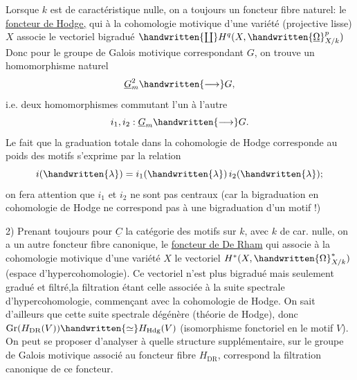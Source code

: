 Lorsque $k$ est de caractéristique nulle, on a toujours un foncteur fibre naturel: le \uline{foncteur de Hodge,} qui à la cohomologie motivique d'une variété (projective lisse) $X$ associe le vectoriel bigradué $\handwritten{\coprod}H^q(X,\handwritten{\underline{\Omega}}^p_{X/k})$ Donc pour le groupe de Galois motivique correspondant $G$, on trouve un homomorphisme naturel
\[
\underline{G}_m^2\handwritten{\longrightarrow}G,
\]
i.e. deux homomorphismes commutant l'un à l'autre
\[
i_1,i_2:\underline{G}_m\handwritten{\longrightarrow}G.
\]
Le fait que la graduation totale dans la cohomologie de Hodge corresponde au poids des motifs s'exprime par la relation
\[
i(\handwritten{\lambda})=i_1(\handwritten{\lambda})\,i_2(\handwritten{\lambda});
\]
on fera attention que $i_1$ et $i_2$ ne sont pas centraux (car la bigraduation en cohomologie de Hodge ne correspond pas à une bigraduation d'un motif !)

2) Prenant toujours pour $\underline{C}$ la catégorie des motifs sur $k$, avec $k$ de car. nulle, on a un autre foncteur fibre canonique, le \uline{foncteur de De Rham} qui associe à la cohomologie motivique d'une variété $X$ le vectoriel $H^*(X,\handwritten{\Omega}^*_{X/k})$ (espace d'hypercohomologie). Ce vectoriel n'est plus bigradué mais seulement gradué et filtré,\handwritten{(}la filtration étant celle associée à la suite spectrale d'hypercohomologie, commençant avec la cohomologie de Hodge\handwritten{)}. On sait d'ailleurs que cette suite spectrale dégénère (théorie de Hodge), donc $\operatorname{Gr}(H_{\mathrm{DR}}(V))\handwritten{\simeq}H_{\mathrm{Hdg}}(V)$ (isomorphisme fonctoriel en le motif $V$). On peut se proposer d'analyser à quelle structure supplémentaire, sur le groupe de Galois motivique associé au foncteur fibre $H_{\mathrm{DR}}$, correspond la filtration canonique de ce foncteur.

